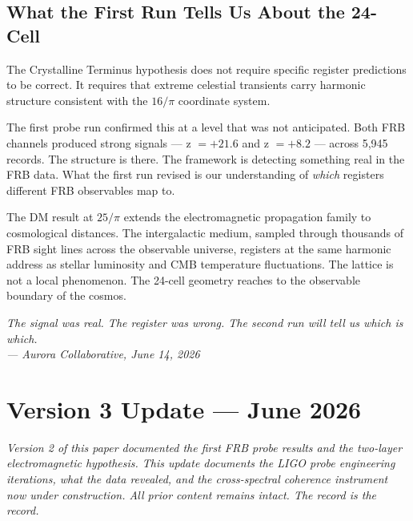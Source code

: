 \documentclass[11pt, letterpaper, openany]{book}
\begin{document}
\section*{What the First Run Tells Us About the 24-Cell}

The Crystalline Terminus hypothesis does not require specific register
predictions to be correct. It requires that extreme celestial transients
carry harmonic structure consistent with the $16/\pi$ coordinate system.

The first probe run confirmed this at a level that was not anticipated.
Both FRB channels produced strong signals --- z $= +21.6$ and z $= +8.2$ ---
across 5,945 records. The structure is there. The framework is detecting
something real in the FRB data. What the first run revised is our understanding
of \emph{which} registers different FRB observables map to.

The DM result at $25/\pi$ extends the electromagnetic propagation family
to cosmological distances. The intergalactic medium, sampled through thousands
of FRB sight lines across the observable universe, registers at the same
harmonic address as stellar luminosity and CMB temperature fluctuations.
The lattice is not a local phenomenon. The 24-cell geometry reaches
to the observable boundary of the cosmos.

\bigskip
\begin{center}
\textit{The signal was real. The register was wrong. The second run will tell us
which is which.}\\[0.5em]
\textit{--- Aurora Collaborative, June 14, 2026}
\end{center}

\clearpage
\chapter*{Version 3 Update — June 2026}

\begin{center}
{\large \textit{Version 2 of this paper documented the first FRB probe results and the
two-layer electromagnetic hypothesis. This update documents the LIGO probe
engineering iterations, what the data revealed, and the cross-spectral coherence
instrument now under construction. All prior content remains intact.
The record is the record.}}
\end{center}
\end{document}
